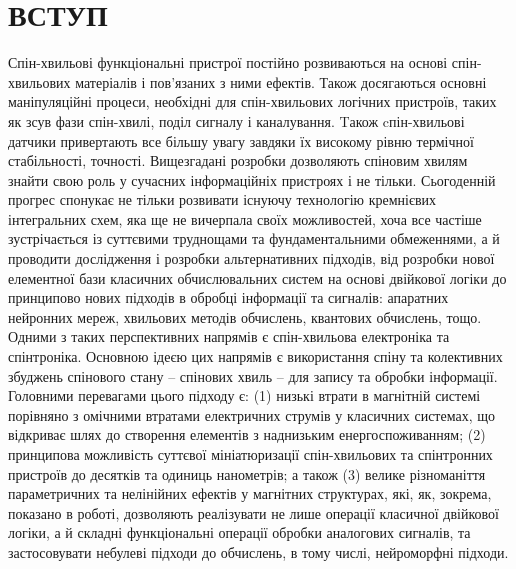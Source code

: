 \documentclass[a4paper,14pt]{extreport}
\begin{document}
\newpage





\chapter{ВСТУП}\par
Спін-хвильові функціональні пристрої  постійно розвиваються на основі спін-хвильових матеріалів і пов'язаних з ними ефектів. Також досягаються основні маніпуляційні процеси, необхідні для спін-хвильових логічних пристроїв, таких як зсув фази спін-хвилі, поділ сигналу і каналування. Tакож cпін-хвильові датчики  привертають все більшу увагу завдяки їх високому рівню термічної стабільності, точності. Вищезгадані розробки дозволяють спіновим хвилям знайти свою роль у сучасних  інформаційніх пристроях і не тільки. Сьогоденній прогрес  спонукає не тільки розвивати існуючу технологію
кремнієвих інтегральних схем, яка ще не вичерпала своїх можливостей, хоча все частіше
зустрічається із суттєвими труднощами та фундаментальними обмеженнями, а й проводити
дослідження і розробки альтернативних підходів, від розробки нової елементної бази
класичних обчислювальних систем на основі двійкової логіки до принципово нових підходів
в обробці інформації та сигналів: апаратних нейронних мереж, хвильових методів обчислень,
квантових обчислень\cite{lit1}, тощо.\\

Одними з таких перспективних напрямів є спін-хвильова електроніка та спінтроніка.
Основною ідеєю цих напрямів є використання спіну та колективних збуджень спінового стану
– спінових хвиль – для запису та обробки інформації. Головними перевагами цього підходу є:
(1) низькі втрати в магнітній системі порівняно з омічними втратами електричних струмів у
класичних системах, що відкриває шлях до створення елементів з наднизьким
енергоспоживанням; (2) принципова можливість суттєвої мініатюризації спін-хвильових та
спінтронних пристроїв до десятків та одиниць нанометрів; а також (3) велике різноманіття
параметричних та нелінійних ефектів у магнітних структурах, які, як, зокрема, показано в
роботі, дозволяють реалізувати не лише операції класичної двійкової логіки, а й складні
функціональні операції обробки аналогових сигналів, та застосовувати небулеві підходи до
обчислень, в тому числі, нейроморфні підходи.\\ 
\end{document}
